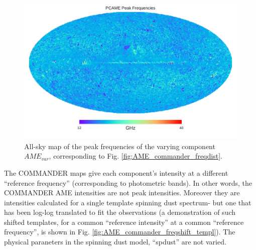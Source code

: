         \begin{figure}
          \label{fig:PCAME_var_freq.pdf}
          \includegraphics[width=\textwidth]{../Plots/ch_datasources/PCAME_var_freq.pdf}
          \centering
          \caption{All-sky map of the peak frequencies of the varying component $AME_{var}$, corresponding to Fig. \ref{fig:AME_commander_freqdist}.}
        \end{figure}

        The COMMANDER maps give each component's intensity at a different ``reference frequency'' (corresponding to photometric bands). In other words, the COMMANDER AME intensities are not peak intensities. Moreover they are intensities calculated for a single template spinning dust spectrum- but one that has been log-log translated to fit the observations (a demonstration of such shifted templates, for a common ``reference intensity'' at a common ``reference frequency'', is shown in Fig. \ref{fig:AME_commander_freqshift_templ}). The physical paraneters in the spinning dust model, ``spdust'' are not varied.

